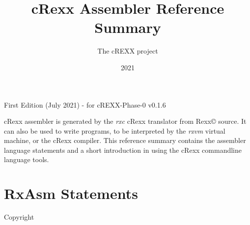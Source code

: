 \documentclass[10pt]{article}
\title{\fontspec{Helvetica}\textbf{cRexx Assembler Reference Summary}}
\author{The cREXX project}
\date{2021}
\renewcommand{\maketitle}{%
{\begin{center}\Large \mythetitle\end{center}}
}
\begin{document}
\begin{multicols}{3}
  \maketitle
\hrulefill 

First Edition (July 2021) - for cREXX-Phase-0 v0.1.6
\tableofcontents
\hrulefill

cRexx assembler is generated by the \emph{rxc} cRexx translator from Rexx\copyright{} source. It can also be used to write programs, to be interpreted by the \emph{rxvm} virtual machine, or the cRexx compiler. This reference summary contains the assembler language statements and a short introduction in using the cRexx commandline language tools.

\section{ RxAsm Statements}


\noindent Copyright \textcopyright{} \thedate{} \theauthor{}

\end{multicols}
\end{document}
